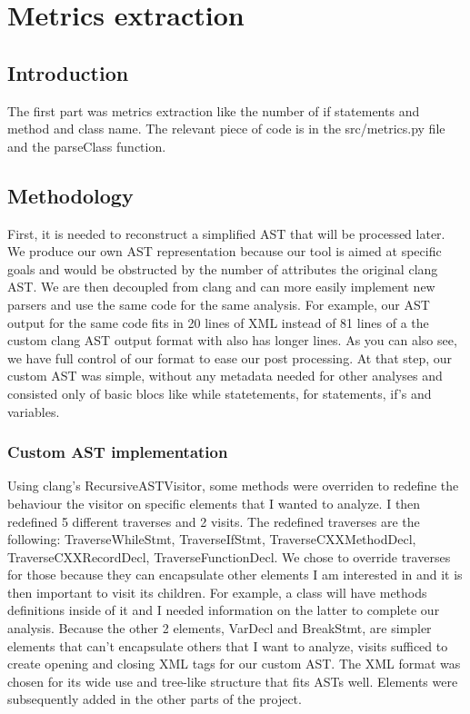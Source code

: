 \documentclass[conference,compsoc]{IEEEtran}
\begin{document}
\section{Metrics extraction}
\subsection{Introduction}
The first part was metrics extraction like the number of if statements and method and class name. The relevant piece of code is in the src/metrics.py file and the parseClass function.
\subsection{Methodology}
 First, it is needed to reconstruct a simplified AST that will be processed later. We produce our own AST representation because our tool is aimed at specific goals and would be obstructed by the number of attributes the original clang AST. We are then decoupled from clang and can more easily implement new parsers and use the same code for the same analysis. For example, our AST output for the same code fits in 20 lines of XML instead of 81 lines of a the custom clang AST output format with also has longer lines. As you can also see, we have full control of our format to ease our post processing.
At that step, our custom AST was simple, without any metadata needed for other analyses and consisted only of basic blocs like while statetements, for statements, if's and variables.
\subsubsection{Custom AST implementation}
Using clang's RecursiveASTVisitor, some methods were overriden to
 redefine the behaviour the visitor on specific elements that I
 wanted to analyze. I then redefined 5 different traverses and 2 visits.
The redefined traverses are the following: TraverseWhileStmt, TraverseIfStmt,
TraverseCXXMethodDecl, TraverseCXXRecordDecl, TraverseFunctionDecl. We chose to
override traverses for those because they can encapsulate other elements I am
interested in and it is then important to visit its children. For example, a 
class will have methods definitions inside of it and I needed information on the
latter to complete our analysis. Because the other 2 elements, VarDecl and BreakStmt, are simpler elements that can't encapsulate others that I want to analyze, visits
sufficed to create opening and closing XML tags for our custom AST. The XML format 
was chosen for its wide use and tree-like structure that fits ASTs well. 
Elements were subsequently added in the other parts of the project.
\end{document}

